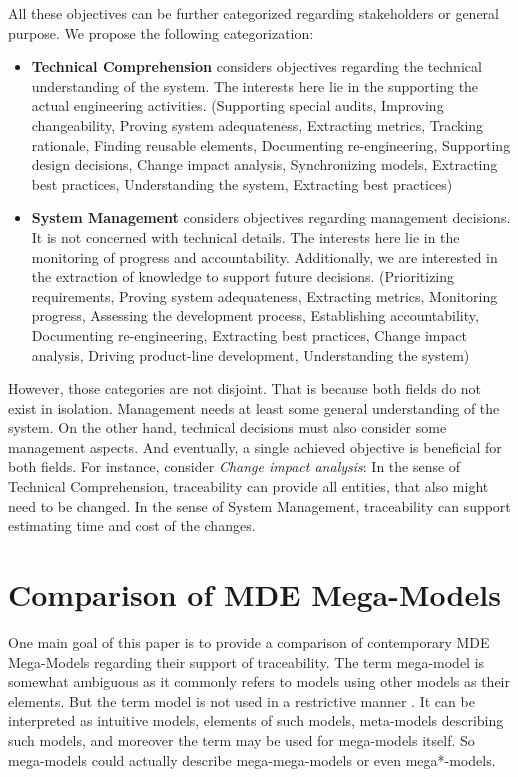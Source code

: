 \documentclass[runningheads,a4paper]{llncs}
\begin{document}
All these objectives can be further categorized regarding stakeholders or general purpose.
We propose the following categorization:
\begin{itemize}

\item
\textbf{Technical Comprehension}
considers objectives regarding the technical understanding of the system.
The interests here lie in the supporting the actual engineering activities.
(Supporting special audits,
Improving changeability,
Proving system adequateness,
Extracting metrics,
Tracking rationale,
Finding reusable elements,
Documenting re-engineering, 
Supporting design decisions,
Change impact analysis,
Synchronizing models,
Extracting best practices,
Understanding the system,
Extracting best practices)


\item
\textbf{System Management}
considers objectives regarding management decisions. 
It is not concerned with technical details.
The interests here lie in the monitoring of progress and accountability.
Additionally, we are interested in the extraction of knowledge to support future decisions.
(Prioritizing requirements,
Proving system adequateness,
Extracting metrics,
Monitoring progress, 
Assessing the development process,
Establishing accountability,
Documenting re-engineering,
Extracting best practices,
Change impact analysis,
Driving product-line development,
Understanding the system)

\end{itemize}
However, those categories are not disjoint.
That is because both fields do not exist in isolation.
Management needs at least some general understanding of the system.
On the other hand, technical decisions must also consider some management aspects.
And eventually, a single achieved objective is beneficial for both fields.
For instance, consider \textit{Change impact analysis}:
In the sense of Technical Comprehension, traceability can provide all entities, that also might need to be changed.
In the sense of System Management, traceability can support estimating time and cost of the changes. 


\section{Comparison of MDE Mega-Models}
\label{sec:Comparison-of-MDE-Mega-Models}
One main goal of this paper is to provide a comparison of contemporary MDE Mega-Models regarding their support of traceability.
The term mega-model is somewhat ambiguous as it commonly refers to models using other models as their elements. 
But the term model is not used in a restrictive manner \cite{MEGAL2}.
It can be interpreted as intuitive models, elements of such models, meta-models describing such models, and moreover the term may be used for mega-models itself.
So mega-models could actually describe mega-mega-models or even mega*-models. 
\end{document}
